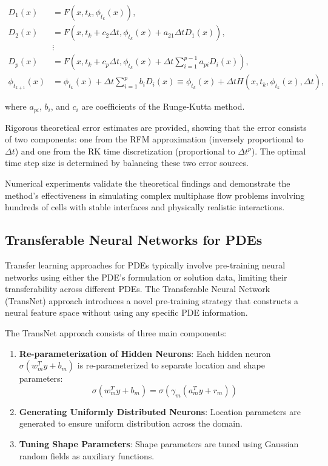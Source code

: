 \documentclass[11pt]{article}
\begin{document}
\begin{align}
    D_1(x) &= F(x,t_k,\phi_{t_k}(x)), \\
    D_2(x) &= F(x,t_k+c_2\Delta t,\phi_{t_k}(x)+a_{21}\Delta t D_1(x)), \\
    &\vdots \\
    D_p(x) &= F(x,t_k+c_p\Delta t,\phi_{t_k}(x)+\Delta t\sum_{i=1}^{p-1}a_{pi}D_i(x)), \\
    \phi_{t_{k+1}}(x) &= \phi_{t_k}(x)+\Delta t\sum_{i=1}^{p}b_i D_i(x) \equiv \phi_{t_k}(x)+\Delta t H(x,t_k,\phi_{t_k}(x),\Delta t),
\end{align}

where $a_{pi}$, $b_i$, and $c_i$ are coefficients of the Runge-Kutta method.

Rigorous theoretical error estimates are provided, showing that the error consists of two components: one from the RFM approximation (inversely proportional to $\Delta t$) and one from the RK time discretization (proportional to $\Delta t^p$). The optimal time step size is determined by balancing these two error sources.

Numerical experiments validate the theoretical findings and demonstrate the method's effectiveness in simulating complex multiphase flow problems involving hundreds of cells with stable interfaces and physically realistic interactions.

\subsection{Transferable Neural Networks for PDEs}

Transfer learning approaches for PDEs typically involve pre-training neural networks using either the PDE's formulation or solution data, limiting their transferability across different PDEs. The Transferable Neural Network (TransNet) \citep{Zhang2023} approach introduces a novel pre-training strategy that constructs a neural feature space without using any specific PDE information.

The TransNet approach consists of three main components:
\begin{enumerate}
    \item \textbf{Re-parameterization of Hidden Neurons}: Each hidden neuron $\sigma(w_m^T y + b_m)$ is re-parameterized to separate location and shape parameters:
    \begin{equation}
        \sigma(w_m^T y + b_m) = \sigma(\gamma_m(a_m^T y + r_m))
    \end{equation}
    
    \item \textbf{Generating Uniformly Distributed Neurons}: Location parameters are generated to ensure uniform distribution across the domain.
    
    \item \textbf{Tuning Shape Parameters}: Shape parameters are tuned using Gaussian random fields as auxiliary functions.
\end{enumerate}
\end{document}
